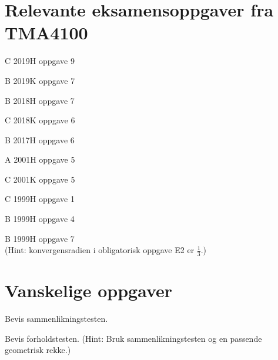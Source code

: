 \documentclass[a4paper,norsk,11pt]{interaktiv}
\begin{document}
\section*{Relevante eksamensoppgaver fra TMA4100}

\begin{oppgave}{C}
2019H oppgave 9
\end{oppgave}

\begin{oppgave}{B}
2019K oppgave 7
\end{oppgave}

\begin{oppgave}{B}
2018H oppgave 7
\end{oppgave}

\begin{oppgave}{C}
2018K oppgave 6
\end{oppgave}

\begin{oppgave}{B}
2017H oppgave 6
\end{oppgave}

\begin{oppgave}{A}
2001H oppgave 5
\end{oppgave}

\begin{oppgave}{C}
2001K oppgave 5
\end{oppgave}

\begin{oppgave}{C}
1999H oppgave 1
\end{oppgave}

\begin{oppgave}{B}
1999H oppgave 4
\end{oppgave}

\begin{oppgave}{B}
1999H oppgave 7 \\
(Hint: konvergensradien i obligatorisk oppgave E2 er $\frac{1}{3}$.)
\end{oppgave}






\section*{Vanskelige oppgaver}

\begin{oppgave}{1}
Bevis sammenlikningstesten. 
\end{oppgave}

\begin{oppgave}{2}
Bevis forholdstesten. (Hint: Bruk sammenlikningstesten og en passende geometrisk rekke.)
\end{oppgave}
%
%


\end{document}
